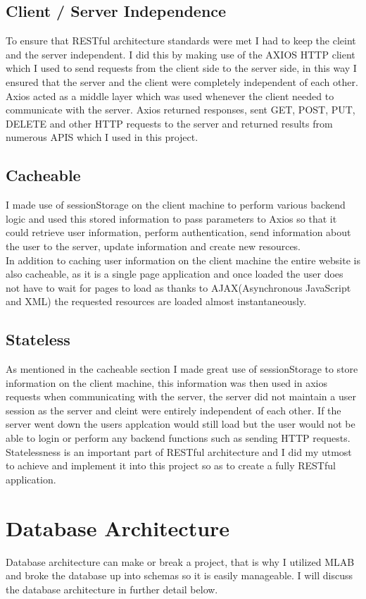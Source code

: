 \subsection{Client / Server Independence}
To ensure that RESTful architecture standards were met I had to keep the cleint
and the server independent.  I did this by making use of the AXIOS HTTP client which
I used to send requests from the client side to the server side, in this way I ensured
that the server and the client were completely independent of each other.  Axios acted
as a middle layer which was used whenever the client needed to communicate with the server.
Axios returned responses, sent GET, POST, PUT, DELETE and other HTTP requests to the server
and returned results from numerous APIS which I used in this project.
\subsection{Cacheable}
I made use of sessionStorage on the client machine to perform various backend logic and
used this stored information to pass parameters to Axios so that it could retrieve user information,
perform authentication, send information about the user to the server, update information and create new resources.
\\
In addition to caching user information on the client machine the entire website is also cacheable, as it is a single page
application and once loaded the user does not have to wait for pages to load as thanks to AJAX(Asynchronous JavaScript and XML)
the requested resources are loaded almost instantaneously.
\subsection{Stateless}
As mentioned in the cacheable section I made great use of sessionStorage to store information on the client machine, this information was then used in axios requests when communicating with the server, the server did not maintain a user session as the server and cleint were entirely independent of each other.  If the server went down the users applcation would still load but the user would not be able to login or perform any backend functions such as sending HTTP requests.  Statelessness is an important part of RESTful architecture and I did my utmost to achieve and implement it into this project so as to create a fully RESTful application.
\section{Database Architecture}
Database architecture can make or break a project, that is why I utilized MLAB and broke the database up into schemas so it is easily manageable.  I will discuss the database architecture in further detail below.
